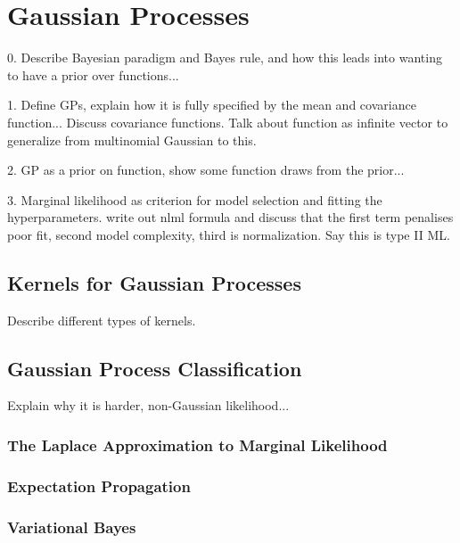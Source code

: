 \documentclass[a4paper,12pt ]{report}
\begin{document}

\chapter{Gaussian Processes}

0. Describe Bayesian paradigm and Bayes rule, and how this leads into wanting to have a prior over functions... 

1. Define GPs, explain how it is fully specified by the mean and covariance function... Discuss covariance functions. Talk about function as infinite vector to generalize from multinomial Gaussian to this. 

2. GP as a prior on function, show some function draws from the prior...

3. Marginal likelihood as criterion for model selection and fitting the hyperparameters. write out nlml formula and discuss that the first term penalises poor fit, second model complexity, third is normalization. Say this is type II ML.



\section{Kernels for Gaussian Processes}

Describe different types of kernels. 

\section{Gaussian Process Classification}

Explain why it is harder, non-Gaussian likelihood...

\subsection{The Laplace Approximation to Marginal Likelihood}

\subsection{Expectation Propagation}

\subsection{Variational Bayes}
\end{document}
